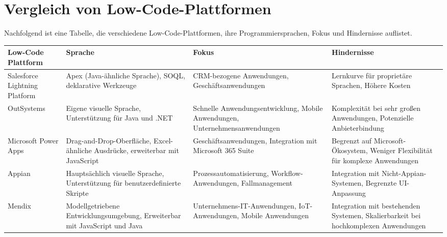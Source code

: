 
\section{Vergleich von Low-Code-Plattformen}
Nachfolgend ist eine Tabelle, die verschiedene Low-Code-Plattformen, ihre Programmiersprachen, Fokus und Hindernisse auflistet.

\begin{longtable}{|m{3cm}|m{3cm}|m{4cm}|m{5cm}|}
\hline
\textbf{Low-Code Plattform} & \textbf{Sprache} & \textbf{Fokus} & \textbf{Hindernisse} \\
\hline
\endhead
Salesforce Lightning Platform & Apex (Java-ähnliche Sprache), SOQL, deklarative Werkzeuge & CRM-bezogene Anwendungen, Geschäftsanwendungen & Lernkurve für proprietäre Sprachen, Höhere Kosten \\
\hline
OutSystems & Eigene visuelle Sprache, Unterstützung für Java und .NET & Schnelle Anwendungsentwicklung, Mobile Anwendungen, Unternehmensanwendungen & Komplexität bei sehr großen Anwendungen, Potenzielle Anbieterbindung \\
\hline
Microsoft Power Apps & Drag-and-Drop-Oberfläche, Excel-ähnliche Ausdrücke, erweiterbar mit JavaScript & Geschäftsanwendungen, Integration mit Microsoft 365 Suite & Begrenzt auf Microsoft-Ökosystem, Weniger Flexibilität für komplexe Anwendungen \\
\hline
Appian & Hauptsächlich visuelle Sprache, Unterstützung für benutzerdefinierte Skripte & Prozessautomatisierung, Workflow-Anwendungen, Fallmanagement & Integration mit Nicht-Appian-Systemen, Begrenzte UI-Anpassung \\
\hline
Mendix & Modellgetriebene Entwicklungsumgebung, Erweiterbar mit JavaScript und Java & Unternehmens-IT-Anwendungen, IoT-Anwendungen, Mobile Anwendungen & Integration mit bestehenden Systemen, Skalierbarkeit bei hochkomplexen Anwendungen \\
\hline
\end{longtable}
